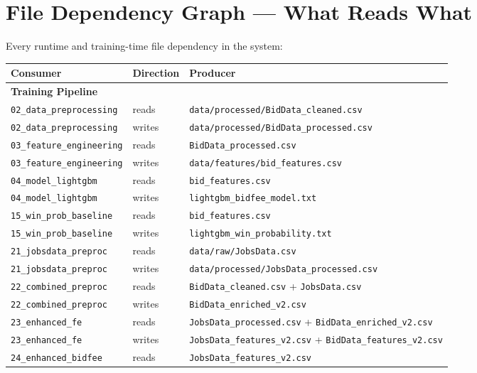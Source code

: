 \documentclass[11pt,a4paper]{article}
\newcommand{\file}[1]{\texttt{\color{gssblue!70!black}#1}}
\begin{document}
\section{File Dependency Graph --- What Reads What}
\label{sec:filedeps}

Every runtime and training-time file dependency in the system:

\begin{longtable}{p{5cm} l p{6cm}}
\toprule
\textbf{Consumer} & \textbf{Direction} & \textbf{Producer} \\
\midrule
\endhead
\multicolumn{3}{l}{\textbf{Training Pipeline}} \\
\file{02\_data\_preprocessing} & reads & \file{data/processed/BidData\_cleaned.csv} \\
\file{02\_data\_preprocessing} & writes & \file{data/processed/BidData\_processed.csv} \\
\file{03\_feature\_engineering} & reads & \file{BidData\_processed.csv} \\
\file{03\_feature\_engineering} & writes & \file{data/features/bid\_features.csv} \\
\file{04\_model\_lightgbm} & reads & \file{bid\_features.csv} \\
\file{04\_model\_lightgbm} & writes & \file{lightgbm\_bidfee\_model.txt} \\
\file{15\_win\_prob\_baseline} & reads & \file{bid\_features.csv} \\
\file{15\_win\_prob\_baseline} & writes & \file{lightgbm\_win\_probability.txt} \\
\file{21\_jobsdata\_preproc} & reads & \file{data/raw/JobsData.csv} \\
\file{21\_jobsdata\_preproc} & writes & \file{data/processed/JobsData\_processed.csv} \\
\file{22\_combined\_preproc} & reads & \file{BidData\_cleaned.csv} + \file{JobsData.csv} \\
\file{22\_combined\_preproc} & writes & \file{BidData\_enriched\_v2.csv} \\
\file{23\_enhanced\_fe} & reads & \file{JobsData\_processed.csv} + \file{BidData\_enriched\_v2.csv} \\
\file{23\_enhanced\_fe} & writes & \file{JobsData\_features\_v2.csv} + \file{BidData\_features\_v2.csv} \\
\file{24\_enhanced\_bidfee} & reads & \file{JobsData\_features\_v2.csv} \\

\end{longtable}
\end{document}
